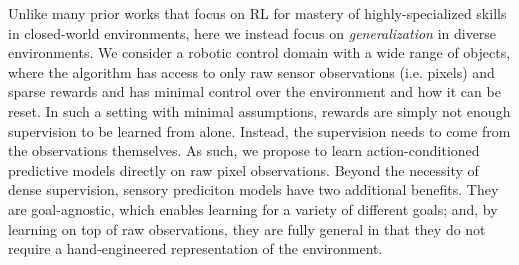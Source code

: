 Unlike many prior works that focus on RL for mastery of highly-specialized skills in closed-world environments, here we instead focus on \emph{generalization} in diverse environments.
We consider a robotic control domain with a wide range of objects, where the algorithm has access to only raw sensor observations (i.e. pixels) and sparse rewards and has minimal control over the environment and how it can be reset. In such a setting with minimal assumptions, rewards are simply not enough supervision
to be learned from alone. Instead, the supervision needs to come from the observations themselves. As such, we propose to learn action-conditioned predictive models directly on raw pixel observations.
Beyond the necessity of dense supervision, sensory prediciton models have two additional benefits. They are goal-agnostic, which enables learning for a variety of different goals; and, by learning on top of raw observations, they are fully general in that they do not require a hand-engineered representation of the environment.


